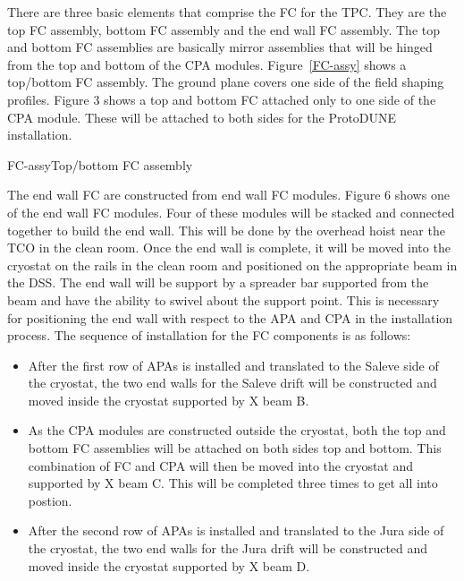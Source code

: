 
There are three basic elements that comprise the FC for the TPC.  They are the top FC assembly, bottom FC assembly and the end wall FC assembly.  The top and bottom FC assemblies are basically mirror assemblies that will be hinged from the top and bottom of the CPA modules.  Figure~\ref{FC-assy} shows a top/bottom FC assembly.  The ground plane covers one side of the field shaping profiles.  Figure 3 shows a top and bottom FC attached only to one side of the CPA module.  These will be attached to both sides for the ProtoDUNE installation.  

\begin{cdrfigure}{FC-assy}{Top/bottom FC assembly }
\end{cdrfigure}

The end wall FC are constructed from end wall FC modules.  Figure 6 shows one of the end wall FC modules.  Four of these modules will be stacked and connected together to build the end wall.  This will be done by the overhead hoist near the TCO in the clean room.  Once the end wall is complete, it will be moved into the cryostat on the rails in the clean room and positioned on the appropriate beam in the DSS.  The end wall will be support by a spreader bar supported from the beam and have the ability to swivel about the support point.  This is necessary for positioning the end wall with respect to the APA and CPA in the installation process.  
The sequence of installation for the FC components is as follows:
\begin{itemize}
\item After the first row of APAs is installed and translated to the Saleve side of the cryostat, the two end walls for the Saleve drift will be constructed and moved inside the cryostat supported by X beam B.  
\item As the CPA modules are constructed outside the cryostat, both the top and bottom FC assemblies will be attached on both sides top and bottom.  This combination of FC and CPA will then be moved into the cryostat and supported by X beam C.  This will be completed three times to get all into postion.
\item After the second row of APAs is installed and translated to the Jura side of the cryostat, the two end walls for the Jura drift will be constructed and moved inside the cryostat supported by X beam D.  
\end{itemize}

